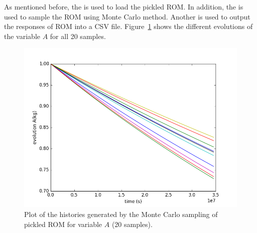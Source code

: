 As mentioned before, the  is used to load the pickled ROM. In addition, the  is
used to sample the ROM using Monte Carlo method. Another  is used to output the responses of ROM
into a CSV file. Figure~\ref{fig:historiesROMPlotLine_A} shows the different evolutions of the variable $A$ for
all 20 samples.

\begin{figure}[h!]
  \centering
  \includegraphics[scale=0.7]{../../tests/framework/user_guide/ravenTutorial/gold/ROMLoad/1-historyROMPlot_line.png}
  \caption{Plot of the histories generated by the Monte Carlo sampling of pickled ROM for variable $A$ (20 samples).}
  \label{fig:historiesROMPlotLine_A}
\end{figure}











